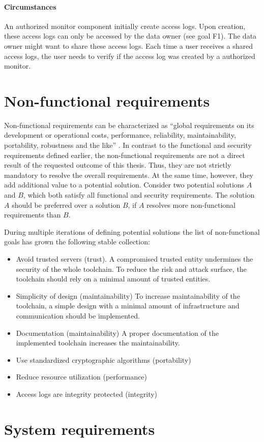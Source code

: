 \documentclass[../main.tex]{subfiles}
\begin{document}
\paragraph{Circumstances}
An authorized monitor component initially create access logs. 
Upon creation, these access logs can only be accessed by the data owner (see goal F1).
The data owner might want to share these access logs.
Each time a user receives a shared access logs, the user needs to verify if the access log was created by a authorized monitor.

\section{Non-functional requirements}\label{non-functional-requriements}
Non-functional requirements can be characterized as \enquote{global requirements on its development or operational costs, performance, reliability, maintainability, portability, robustness and the like} \cite[11]{Mylopoulos1992}.
In contrast to the functional and security requirements defined earlier, the non-functional requirements are not a direct result of the requested outcome of this thesis.
Thus, they are not strictly mandatory to resolve the overall requirements.
At the same time, however, they add additional value to a potential solution.
Consider two potential solutions $A$ and $B$, which both satisfy all functional and security requirements.
The solution $A$ should be preferred over a solution $B$, if $A$ resolves more non-functional requirements than $B$.

During multiple iterations of defining potential solutions the list of non-functional goals has grown the following stable collection:

\begin{itemize}
    \item Avoid trusted servers (trust). 
    A compromised trusted entity undermines the security of the whole toolchain. 
    To reduce the risk and attack surface, the toolchain should rely on a minimal amount of trusted entities.
    \item Simplicity of design (maintainability)
    To increase maintainability of the toolchain, a simple design with a minimal amount of infrastructure and communication should be implemented.
    \item Documentation (maintainability)
    A proper documentation of the implemented toolchain increases the maintainability.
    \item Use standardized cryptographic algorithms (portability)
    \item Reduce resource utilization (performance)
    \item Access logs are integrity protected (integrity)
\end{itemize}


\section{System requirements}\label{system-requriements}
\end{document}
